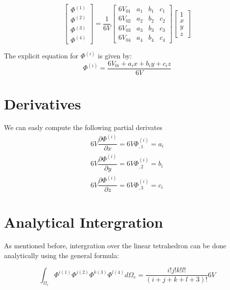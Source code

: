 \documentclass[en]{minipw} %
\begin{document}
\begin{equation}
\begin{bmatrix}
\Phi^{(1)} \\
\Phi^{(2)} \\
\Phi^{(3)} \\
\Phi^{(4)}
\end{bmatrix}
=
\dfrac{1}{6V}
\begin{bmatrix}
6V_{01} & a_1 & b_1 & c_1 \\
6V_{02} & a_2 & b_2 & c_2 \\
6V_{03} & a_3 & b_3 & c_3 \\
6V_{04} & a_4 & b_4 & c_4
\end{bmatrix}
\begin{bmatrix}
1 \\
x \\
y \\
z
\end{bmatrix}
\end{equation}

The explicit equation for $\Phi^{(i)}$ is given by:
\begin{equation}
\Phi^{(i)} = \dfrac{6V_{0i} + a_i x + b_i y + c_i z}{6V}
\end{equation}

\section{Derivatives}

We can easly compute the following partial derivates
\begin{equation}
\label{eq:tetra_partial_derivates}
\begin{aligned}
6V \dfrac{\partial \Phi^{(i)}}{\partial x} = 6V \Phi^{(i)}_{,1} = a_i
\\
6V \dfrac{\partial \Phi^{(i)}}{\partial y} = 6V \Phi^{(i)}_{,2} = b_i
\\
6V \dfrac{\partial \Phi^{(i)}}{\partial z} = 6V \Phi^{(i)}_{,3} = c_i
\end{aligned}
\end{equation}

\section{Analytical Intergration}

As mentioned before, intergration over the linear tetrahedron can be done analytically using the general formula:

\begin{equation}
\int_{\Omega_{e}} \Phi^{i(1)} \Phi^{j(2)} \Phi^{k(3)} \Phi^{l(4)} d \Omega_{e} = \dfrac{i!j!k!l!}{(i+j+k+l+3)!} 6V
\end{equation}
\end{document}
